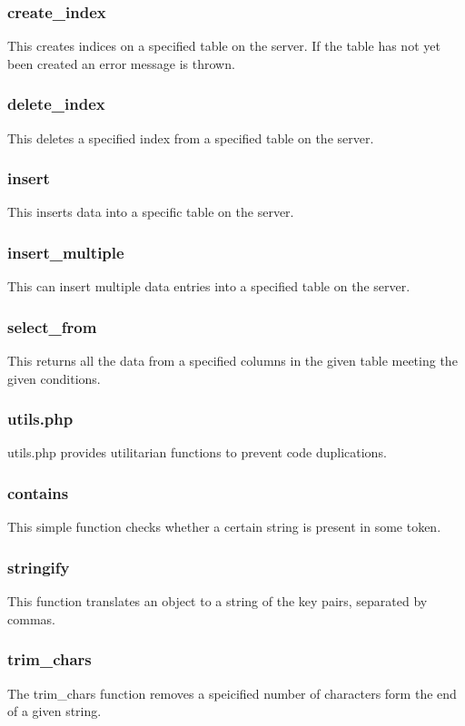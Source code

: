 \documentclass{article}
\begin{document}
\subsubsection*{create\_index}
This creates indices on a specified table on the server. If the table has not yet been created an error message is thrown.

\subsubsection*{delete\_index}
This deletes a specified index from a specified table on the server.

\subsubsection*{insert}
This inserts data into a specific table on the server.

\subsubsection*{insert\_multiple}
This can insert multiple data entries into a specified table on the server.

\subsubsection*{select\_from}
This returns all the data from a specified columns in the given table meeting the given conditions.


\subsubsection{utils.php}
utils.php provides utilitarian functions to prevent code duplications.

\subsubsection*{contains}
This simple function checks whether a certain string is present in some token.

\subsubsection*{stringify}
This function translates an object to a string of the key pairs, separated by commas.

\subsubsection*{trim\_chars}
The trim\_chars function removes a speicified number of characters form the end of a given string.
\end{document}
